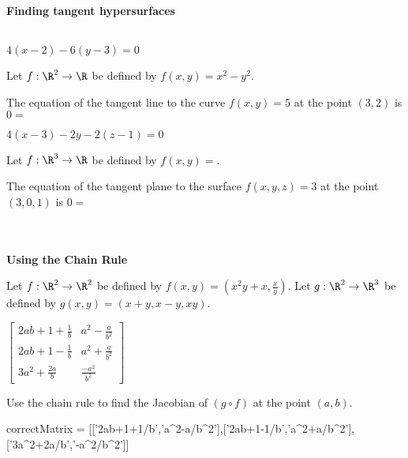 \documentclass{ximera}
\begin{document}
	\\
	\\
	\textbf{Finding tangent hypersurfaces}
	\\
	\\
	\begin{question}
		\begin{hint}
			$4(x-2)-6(y-3) = 0$
		\end{hint}
		Let $f:\R^2 \to \R$ be defined by $f(x,y)=x^2-y^2$.
		\begin{question}
			The equation of the tangent line to the curve $f(x,y)=5$ at the point $(3,2)$ 
			is $0=$ 
		\end{question}
	\end{question}
	
	\begin{question}
		\begin{hint}
			$4(x-3)-2y-2(z-1) = 0$
		\end{hint}
		Let $f:\R^3 \to \R$ be defined by $f(x,y)=$.
		\begin{question}
			The equation of the tangent plane to the surface $f(x,y,z)=3$ at the point $(3,0,1)$ 
			is $0=$ \answer{$4(x-3)-2y-2(z-1)$}
		\end{question}
	\end{question}
	\\
	\\
	\textbf{Using the Chain Rule}
			
	\begin{question}
		Let $f:\R^2 \to \R^2$ be defined by $f(x,y)=(x^2y+x,\frac{x}{y})$.  Let 
		$g:\R^2 \to \R^3$ be defined by $g(x,y) = (x+y,x-y,xy)$.  
		\begin{solution}
			\begin{hint}
				\(\begin{bmatrix} 
				2ab+1+\frac{1}{b}& a^2-\frac{a}{b^2}\\
				2ab+1-\frac{1}{b}& a^2+\frac{a}{b^2}\\
				3a^2+\frac{2a}{b} & \frac{-a^2}{b^2}
				\end{bmatrix}\)
			\end{hint}
		Use the chain rule to find the
		Jacobian of $(g \circ f)$ at the point $(a,b)$.
		
		\begin{matrix-answer}
			correctMatrix = [['2ab+1+1/b','a^2-a/b^2'],['2ab+1-1/b','a^2+a/b^2'],['3a^2+2a/b','-a^2/b^2']]
		\end{matrix-answer}
		\end{solution}
	\end{question}	
	
\end{document}
